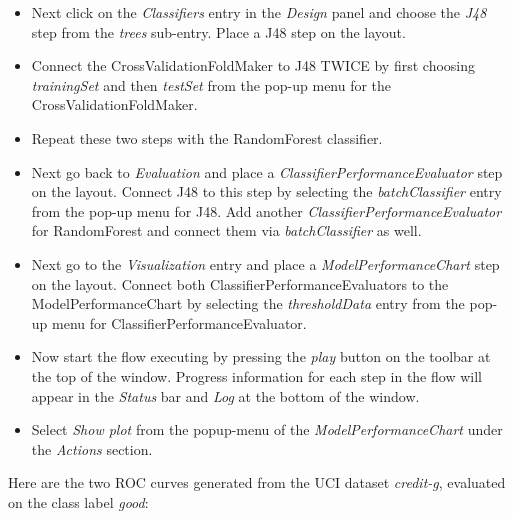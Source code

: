 \begin{itemize}
	\item Next click on the \textit{Classifiers} entry in the
          \textit{Design} panel and choose the \textit{J48} step
          from the \textit{trees} sub-entry. Place a J48 step on
          the layout.

	\item Connect the CrossValidationFoldMaker to J48 TWICE by first choosing
	\textit{trainingSet} and then \textit{testSet} from the pop-up menu for the
	CrossValidationFoldMaker.

	\item Repeat these two steps with the RandomForest classifier.

	\item Next go back to \textit{Evaluation} and place a
	\textit{ClassifierPerformanceEvaluator} step on the layout. Connect J48
	to this step by selecting the \textit{batchClassifier} entry from the
	pop-up menu for J48. Add another \textit{ClassifierPerformanceEvaluator} for
	RandomForest and connect them via \textit{batchClassifier} as well.

	\item Next go to the \textit{Visualization} entry and place a 
	\textit{ModelPerformanceChart} step on the layout. Connect both 
	ClassifierPerformanceEvaluators to the ModelPerformanceChart by selecting 
	the \textit{thresholdData} entry from the pop-up menu for ClassifierPerformanceEvaluator.

	\item Now start the flow executing by pressing the
          \textit{play} button on the toolbar at the top of the
          window. Progress information for each step in the flow
          will appear in the \textit{Status} bar and \textit{Log} at
          the bottom of the window.
	
	\item Select \textit{Show plot} from the popup-menu of the 
	\textit{ModelPerformanceChart} under the \textit{Actions} section.
\end{itemize}

Here are the two ROC curves generated from the UCI dataset \textit{credit-g}, 
evaluated on the class label \textit{good}:

\begin{center}
\end{center}


